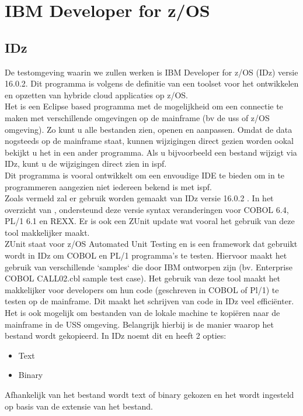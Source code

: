 \section{IBM Developer for z/OS}
\label{sec:IBM Developer for z/OS (IDz)}
\subsection{IDz}
De testomgeving waarin we zullen werken is IBM Developer for z/OS (IDz) versie 16.0.2. Dit programma is volgens de definitie van \textcite{Spohn2023} een toolset voor het ontwikkelen en opzetten van hybride cloud applicaties op z/OS. \\
Het is een Eclipse based programma met de mogelijkheid om een connectie te maken met verschillende omgevingen op de mainframe (bv de \acrshort{uss} of z/OS omgeving). Zo kunt u alle bestanden zien, openen en aanpassen. Omdat de data nogsteeds op de mainframe staat, kunnen wijzigingen direct gezien worden ookal bekijkt u het in een ander programma. Als u bijvoorbeeld een bestand wijzigt via IDz, kunt u de wijzigingen direct zien in \acrshort{ispf}. \\
Dit programma is vooral ontwikkelt om een envoudige IDE te bieden om in te programmeren aangezien niet iedereen bekend is met \acrshort{ispf}. \\

Zoals vermeld zal er gebruik worden gemaakt van IDz versie 16.0.2 . In het overzicht van \textcite{IBM2024}, ondersteund deze versie syntax veranderingen voor COBOL 6.4, PL/1 6.1 en REXX. Er is ook een ZUnit update wat vooral het gebruik van deze tool makkelijker maakt. \\

ZUnit staat voor z/OS Automated Unit Testing en is een framework dat gebruikt wordt in IDz om COBOL en PL/1 programma's te testen. Hiervoor maakt het gebruik van verschillende `samples` die door IBM ontworpen zijn (bv. Enterprise COBOL CALL02.cbl sample test case). Het gebruik van deze tool maakt het makkelijker voor developers om hun code (geschreven in COBOL of Pl/1) te testen op de mainframe. Dit maakt het schrijven van code in IDz veel efficiënter. \autocite{IBM2024a} \\

Het is ook mogelijk om bestanden van de lokale machine te kopiëren naar de mainframe in de USS omgeving. Belangrijk hierbij is de manier waarop het bestand wordt gekopieerd. In IDz noemt dit  en heeft 2 opties: 
\begin{itemize}
    \item Text
    \item Binary
\end{itemize}
Afhankelijk van het bestand wordt text of binary gekozen en het wordt ingesteld op basis van de extensie van het bestand.

